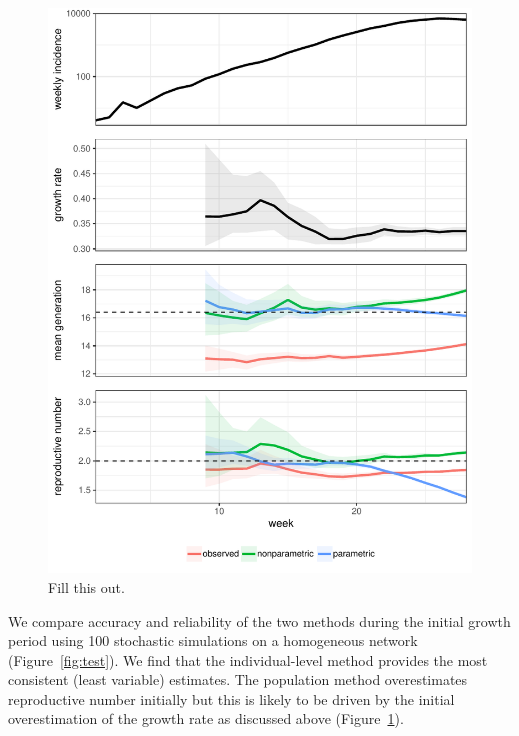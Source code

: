 \documentclass[12pt]{article}
\begin{document}
\begin{figure}
\includegraphics[width=\textwidth]{../fig/example.pdf}
\caption{Fill this out.}
\label{fig:example}
\end{figure}

We compare accuracy and reliability of the two methods during the initial growth period using 100 stochastic simulations on a homogeneous network (Figure~\ref{fig:test}).
We find that the individual-level method provides the most consistent (least variable) estimates.
The population method overestimates reproductive number initially but this is likely to be driven by the initial overestimation of the growth rate as discussed above (Figure~\ref{fig:example}).
\end{document}
